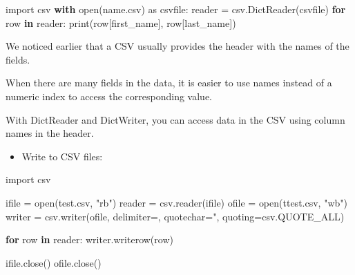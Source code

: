 \documentclass[
  letterpaper,
]{scrbook}
\newenvironment{Shaded}{\begin{snugshade}}{\end{snugshade}}
\newcommand{\BuiltInTok}[1]{\textcolor[rgb]{0.00,0.23,0.31}{#1}}
\newcommand{\ControlFlowTok}[1]{\textcolor[rgb]{0.00,0.23,0.31}{\textbf{#1}}}
\newcommand{\ImportTok}[1]{\textcolor[rgb]{0.00,0.46,0.62}{#1}}
\newcommand{\KeywordTok}[1]{\textcolor[rgb]{0.00,0.23,0.31}{\textbf{#1}}}
\newcommand{\NormalTok}[1]{\textcolor[rgb]{0.00,0.23,0.31}{#1}}
\newcommand{\OperatorTok}[1]{\textcolor[rgb]{0.37,0.37,0.37}{#1}}
\newcommand{\StringTok}[1]{\textcolor[rgb]{0.13,0.47,0.30}{#1}}
\providecommand{\tightlist}{%
  \setlength{\itemsep}{0pt}\setlength{\parskip}{0pt}}
\begin{document}
\begin{Shaded}
\begin{Highlighting}[]
\ImportTok{import}\NormalTok{ csv}
\ControlFlowTok{with} \BuiltInTok{open}\NormalTok{(}\StringTok{\textquotesingle{}name.csv\textquotesingle{}}\NormalTok{) }\ImportTok{as}\NormalTok{ csvfile:}
\NormalTok{    reader }\OperatorTok{=}\NormalTok{ csv.DictReader(csvfile)}
    \ControlFlowTok{for}\NormalTok{ row }\KeywordTok{in}\NormalTok{ reader:}
        \BuiltInTok{print}\NormalTok{(row[}\StringTok{\textquotesingle{}first\_name\textquotesingle{}}\NormalTok{], row[}\StringTok{\textquotesingle{}last\_name\textquotesingle{}}\NormalTok{])}
\end{Highlighting}
\end{Shaded}

We noticed earlier that a CSV usually provides the header with the names
of the fields.

When there are many fields in the data, it is easier to use names
instead of a numeric index to access the corresponding value.

With DictReader and DictWriter, you can access data in the CSV using
column names in the header.

\begin{itemize}
\tightlist
\item
  Write to CSV files:
\end{itemize}

\begin{Shaded}
\begin{Highlighting}[]
\ImportTok{import}\NormalTok{ csv}
 
\NormalTok{ifile  }\OperatorTok{=} \BuiltInTok{open}\NormalTok{(}\StringTok{\textquotesingle{}test.csv\textquotesingle{}}\NormalTok{, }\StringTok{"rb"}\NormalTok{)}
\NormalTok{reader }\OperatorTok{=}\NormalTok{ csv.reader(ifile)}
\NormalTok{ofile  }\OperatorTok{=} \BuiltInTok{open}\NormalTok{(}\StringTok{\textquotesingle{}ttest.csv\textquotesingle{}}\NormalTok{, }\StringTok{"wb"}\NormalTok{)}
\NormalTok{writer }\OperatorTok{=}\NormalTok{ csv.writer(ofile, delimiter}\OperatorTok{=}\StringTok{\textquotesingle{}\textquotesingle{}}\NormalTok{, quotechar}\OperatorTok{=}\StringTok{\textquotesingle{}"\textquotesingle{}}\NormalTok{, quoting}\OperatorTok{=}\NormalTok{csv.QUOTE\_ALL)}
 
\ControlFlowTok{for}\NormalTok{ row }\KeywordTok{in}\NormalTok{ reader:}
\NormalTok{    writer.writerow(row)}
 
\NormalTok{ifile.close()}
\NormalTok{ofile.close()}
\end{Highlighting}
\end{Shaded}
\end{document}
